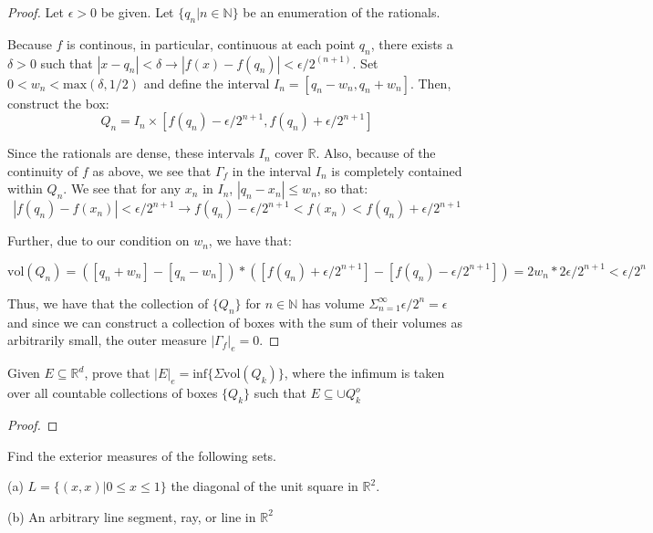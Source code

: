 \documentclass[10pt]{article}
\newenvironment{problem}[2][Problem]{\begin{trivlist}
\item[\hskip \labelsep {\bfseries #1}\hskip \labelsep {\bfseries #2.}]}{\end{trivlist}}
\begin{document}
\begin{proof}[Proof]
Let $\epsilon > 0$ be given. Let $\{ q_n | n \in \mathbb{N} \}$ be an enumeration of the rationals.

Because $f$ is continous, in particular, continuous at each point $q_n$, there exists a $\delta > 0$ such that $ |x - q_n| < \delta \rightarrow |f(x) - f(q_n)| < \epsilon / 2^{(n+1)}$. Set $0 < w_n < \text{max}(\delta,1/2)$ and define the interval $I_n = [q_n - w_n, q_n + w_n]$. Then, construct the box:
$$Q_n = I_n \times [f(q_n) - \epsilon / 2^{n+1}, f(q_n) + \epsilon / 2^{n+1}]$$

Since the rationals are dense, these intervals $I_n$ cover $\mathbb{R}$. Also, because of the continuity of $f$ as above, we see that $\Gamma_f$ in the interval $I_n$ is completely contained within $Q_n$. We see that for any $x_n$ in $I_n$, $|q_n - x_n| \leq w_n$, so that:
$$|f(q_n) - f(x_n)| <  \epsilon / 2^{n+1} \rightarrow f(q_n) - \epsilon / 2^{n+1} <  f(x_n) < f(q_n) + \epsilon / 2^{n+1}$$

Further, due to our condition on $w_n$, we have that:

$$\text{vol}(Q_n) = ( [q_n + w_n] - [q_n - w_n]) * ([ f(q_n) + \epsilon / 2^{n+1}] - [ f(q_n) - \epsilon / 2^{n+1}]) = 2w_n * 2\epsilon/2^{n+1} < \epsilon/2^n $$

Thus, we have that the collection of $\{ Q_n \}$ for $n \in \mathbb{N}$ has volume $\Sigma_{n=1}^{\infty} \epsilon/2^n = \epsilon$ and since we can construct a collection of boxes with the sum of their volumes as arbitrarily small, the outer measure $|\Gamma_f|_e = 0$.

\end{proof}

\begin{problem}{2.1.34}
Given $E \subseteq \mathbb{R}^d$, prove that $|E|_e = \text{inf}\{ \Sigma \text{vol}(Q_k)\}$, where the infimum is taken over all countable collections of boxes $\{Q_k\}$ such that $E \subseteq \cup Q_k^o$
\end{problem}

\begin{proof}[Proof]
\end{proof}

\begin{problem}{2.1.35}
Find the exterior measures of the following sets.

(a) $L = \{(x,x) | 0 \leq x \leq 1 \}$ the diagonal of the unit square in $\mathbb{R}^2$.

(b) An arbitrary line segment, ray, or line in $\mathbb{R}^2$
\end{problem}
\end{document}
